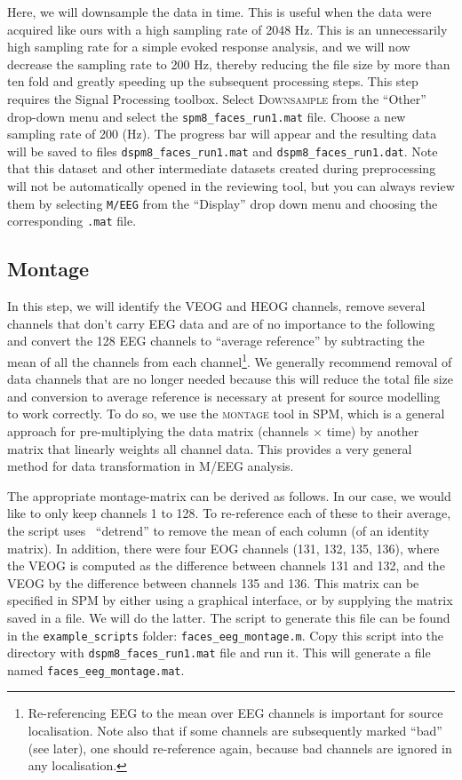 Here, we will downsample the data in time. This is useful when the data were acquired like ours with a high sampling rate of 2048 Hz. This is an unnecessarily high sampling rate for a simple evoked response analysis, and we will now decrease the sampling rate to 200 Hz, thereby reducing the file size by more than ten fold and greatly speeding up the subsequent processing steps. This step requires the Signal Processing toolbox. Select \textsc{Downsample} from the ``Other'' drop-down menu and select the \texttt{spm8\_faces\_run1.mat} file. Choose a new sampling rate of 200 (Hz). The progress bar will appear and the resulting data will be saved to files \texttt{dspm8\_faces\_run1.mat} and \texttt{dspm8\_faces\_run1.dat}. Note that this dataset and other intermediate datasets created during preprocessing will not be automatically opened in the reviewing tool, but you can always review them by selecting \texttt{M/EEG} from the ``Display'' drop down menu and choosing the corresponding \texttt{.mat} file.

\subsection{Montage}

In this step, we will identify the VEOG and HEOG channels, remove several channels that don't carry EEG data and are of no importance to the following and convert the 128 EEG channels to ``average reference'' by subtracting the mean of all the channels from each channel\footnote{Re-referencing EEG to the mean over EEG channels is important for source localisation. Note also that if some channels are subsequently marked ``bad'' (see later), one should re-reference again, because bad channels are ignored in any localisation.}. We generally recommend removal of data channels that are no longer needed because this will reduce the total file size and conversion to average reference is necessary at present for source modelling to work correctly. To do so, we use the \textsc{montage} tool in SPM, which is a general approach for pre-multiplying the data matrix (channels $\times$ time) by another matrix that linearly weights all channel data. This provides a very general method for data transformation in M/EEG analysis.

The appropriate montage-matrix can be derived as follows. In our case, we would like to only keep channels 1 to 128. To re-reference each of these to their average, the script uses \matlab\ ``detrend'' to remove the mean of each column (of an identity matrix). In addition, there were four EOG channels (131, 132, 135, 136), where the VEOG is computed as the difference between channels 131 and 132, and the VEOG by the difference between channels 135 and 136. This matrix can be specified in SPM by either using a graphical interface, or by supplying the matrix saved in a file. We will do the latter. The script to generate this file can be found in the \texttt{example\_scripts} folder: \texttt{faces\_eeg\_montage.m}. Copy this script into the directory with \texttt{dspm8\_faces\_run1.mat} file and run it. This will generate a file named \texttt{faces\_eeg\_montage.mat}.

